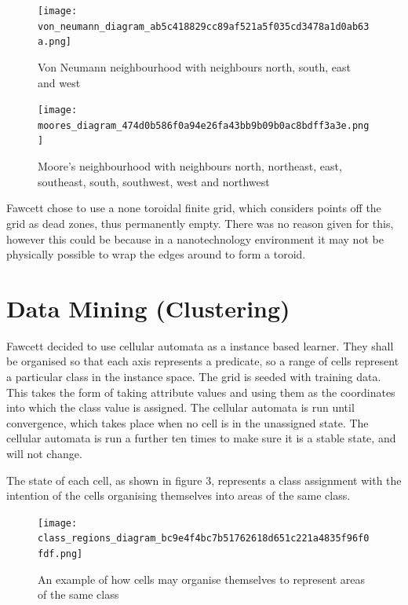 \documentclass[11pt]{article}
\begin{document}
\begin{figure}[htb]
\centering
\texttt{[image: von\_neumann\_diagram\_ab5c418829cc89af521a5f035cd3478a1d0ab63a.png]}
\caption{Von Neumann neighbourhood with neighbours north, south, east and west}
\end{figure}


\begin{figure}[htb]
\centering
\texttt{[image: moores\_diagram\_474d0b586f0a94e26fa43bb9b09b0ac8bdff3a3e.png]}
\caption{Moore's neighbourhood with neighbours north, northeast, east, southeast, south, southwest, west and northwest}
\end{figure}

Fawcett \cite{fawcett08} chose to use a none toroidal finite grid,
which considers points off the grid as dead zones, thus permanently
empty.  There was no reason given for this, however this could be
because in a nanotechnology environment it may not be physically
possible to wrap the edges around to form a toroid.
\section{Data Mining (Clustering)}
\label{sec-3}


  Fawcett \cite{fawcett08} decided to use cellular automata as a
  instance based learner. They shall be organised so that each axis
  represents a predicate, so a range of cells represent a particular
  class in the instance space.  The grid is seeded with training
  data.  This takes the form of taking attribute values and using them
  as the coordinates into which the class value is assigned.  The
  cellular automata is run until convergence, which takes place when
  no cell is in the unassigned state.  The cellular automata is run a
  further ten times to make sure it is a stable state, and will not
  change.

  The state of each cell, as shown in figure 3, represents a class
  assignment with the intention of the cells organising themselves
  into areas of the same class.

\begin{figure}[htb]
\centering
\texttt{[image: class\_regions\_diagram\_bc9e4f4bc7b51762618d651c221a4835f96f0fdf.png]}
\caption{An example of how cells may organise themselves to represent areas of the same class}
\end{figure}
\end{document}
